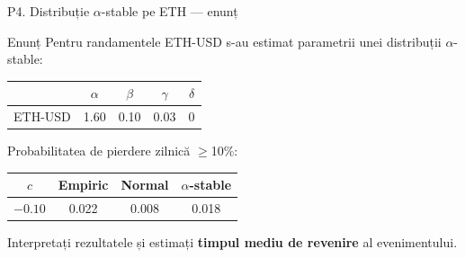 \documentclass[9pt, aspectratio=169, t]{beamer}
\begin{document}
\begin{frame}{P4. Distribuție $\alpha$-stable pe ETH --- enunț}
\begin{block}{Enunț}
Pentru randamentele ETH-USD s-au estimat parametrii unei distribuții $\alpha$-stable:
\begin{center}\small
\begin{tabular}{lcccc}\toprule
 & $\alpha$ & $\beta$ & $\gamma$ & $\delta$\\\midrule
ETH-USD & 1.60 & 0.10 & 0.03 & 0\\\bottomrule
\end{tabular}
\end{center}
Probabilitatea de pierdere zilnică $\geq$10\%:
\begin{center}\small
\begin{tabular}{cccc}\toprule
$c$ & Empiric & Normal & $\alpha$-stable\\\midrule
$-0.10$ & 0.022 & 0.008 & 0.018\\\bottomrule
\end{tabular}
\end{center}
Interpretați rezultatele și estimați \textbf{timpul mediu de revenire} al evenimentului.
\end{block}
\end{frame}
\end{document}
